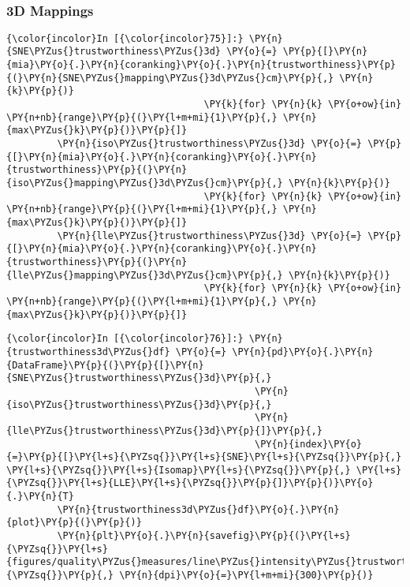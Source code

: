     \begin{center}
    \end{center}
    { \hspace*{\fill} \\}

    \subsubsection{3D Mappings}\label{d-mappings}

    \begin{Verbatim}[commandchars=\\\{\}]
{\color{incolor}In [{\color{incolor}75}]:} \PY{n}{SNE\PYZus{}trustworthiness\PYZus{}3d} \PY{o}{=} \PY{p}{[}\PY{n}{mia}\PY{o}{.}\PY{n}{coranking}\PY{o}{.}\PY{n}{trustworthiness}\PY{p}{(}\PY{n}{SNE\PYZus{}mapping\PYZus{}3d\PYZus{}cm}\PY{p}{,} \PY{n}{k}\PY{p}{)}
                                   \PY{k}{for} \PY{n}{k} \PY{o+ow}{in} \PY{n+nb}{range}\PY{p}{(}\PY{l+m+mi}{1}\PY{p}{,} \PY{n}{max\PYZus{}k}\PY{p}{)}\PY{p}{]}
         \PY{n}{iso\PYZus{}trustworthiness\PYZus{}3d} \PY{o}{=} \PY{p}{[}\PY{n}{mia}\PY{o}{.}\PY{n}{coranking}\PY{o}{.}\PY{n}{trustworthiness}\PY{p}{(}\PY{n}{iso\PYZus{}mapping\PYZus{}3d\PYZus{}cm}\PY{p}{,} \PY{n}{k}\PY{p}{)}
                                   \PY{k}{for} \PY{n}{k} \PY{o+ow}{in} \PY{n+nb}{range}\PY{p}{(}\PY{l+m+mi}{1}\PY{p}{,} \PY{n}{max\PYZus{}k}\PY{p}{)}\PY{p}{]}
         \PY{n}{lle\PYZus{}trustworthiness\PYZus{}3d} \PY{o}{=} \PY{p}{[}\PY{n}{mia}\PY{o}{.}\PY{n}{coranking}\PY{o}{.}\PY{n}{trustworthiness}\PY{p}{(}\PY{n}{lle\PYZus{}mapping\PYZus{}3d\PYZus{}cm}\PY{p}{,} \PY{n}{k}\PY{p}{)}
                                   \PY{k}{for} \PY{n}{k} \PY{o+ow}{in} \PY{n+nb}{range}\PY{p}{(}\PY{l+m+mi}{1}\PY{p}{,} \PY{n}{max\PYZus{}k}\PY{p}{)}\PY{p}{]}
\end{Verbatim}

    \begin{Verbatim}[commandchars=\\\{\}]
{\color{incolor}In [{\color{incolor}76}]:} \PY{n}{trustworthiness3d\PYZus{}df} \PY{o}{=} \PY{n}{pd}\PY{o}{.}\PY{n}{DataFrame}\PY{p}{(}\PY{p}{[}\PY{n}{SNE\PYZus{}trustworthiness\PYZus{}3d}\PY{p}{,}
                                            \PY{n}{iso\PYZus{}trustworthiness\PYZus{}3d}\PY{p}{,}
                                            \PY{n}{lle\PYZus{}trustworthiness\PYZus{}3d}\PY{p}{]}\PY{p}{,}
                                            \PY{n}{index}\PY{o}{=}\PY{p}{[}\PY{l+s}{\PYZsq{}}\PY{l+s}{SNE}\PY{l+s}{\PYZsq{}}\PY{p}{,} \PY{l+s}{\PYZsq{}}\PY{l+s}{Isomap}\PY{l+s}{\PYZsq{}}\PY{p}{,} \PY{l+s}{\PYZsq{}}\PY{l+s}{LLE}\PY{l+s}{\PYZsq{}}\PY{p}{]}\PY{p}{)}\PY{o}{.}\PY{n}{T}
         \PY{n}{trustworthiness3d\PYZus{}df}\PY{o}{.}\PY{n}{plot}\PY{p}{(}\PY{p}{)}
         \PY{n}{plt}\PY{o}{.}\PY{n}{savefig}\PY{p}{(}\PY{l+s}{\PYZsq{}}\PY{l+s}{figures/quality\PYZus{}measures/line\PYZus{}intensity\PYZus{}trustworthiness\PYZus{}3d.png}\PY{l+s}{\PYZsq{}}\PY{p}{,} \PY{n}{dpi}\PY{o}{=}\PY{l+m+mi}{300}\PY{p}{)}
\end{Verbatim}

